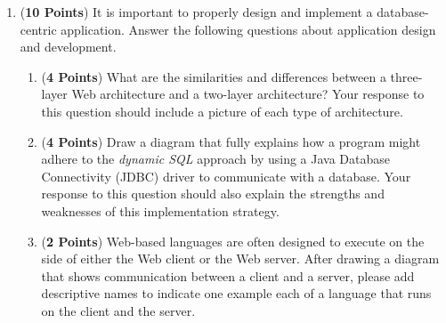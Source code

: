 \documentclass[12pt]{article}
\begin{document}
  \begin{enumerate}

    \item ({\bf 10 Points}) It is important to properly design and
      implement a database-centric application.  Answer the following
      questions about application design and development.

      \begin{enumerate}

        \item ({\bf 4 Points}) What are the similarities and differences between a three-layer Web architecture and a
          two-layer architecture?  Your response to this question should include a picture of each type of architecture.



          \item ({\bf 4 Points}) Draw a diagram that fully explains how a program might adhere to the {\em dynamic SQL}
            approach by using a Java Database Connectivity (JDBC) driver to communicate with a database.  Your response
            to this question should also explain the strengths and weaknesses of this implementation strategy.

          \item ({\bf 2 Points}) Web-based languages are often designed to execute on the side of either the Web client
            or the Web server. After drawing a diagram that shows communication between a client and a server, please
            add descriptive names to indicate one example each of a language that runs on the client and the server.



\end{enumerate}
\end{enumerate}
\end{document}
